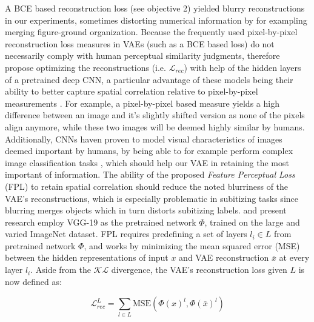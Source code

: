 \documentclass[twocolumn]{article}
\begin{document}
A BCE based reconstruction loss (see objective 2) yielded blurry reconstructions in our experiments, sometimes distorting numerical information by for exampling merging figure-ground organization.
Because the frequently used pixel-by-pixel reconstruction loss measures
in VAEs (such as a BCE based loss) do not necessarily comply with human perceptual similarity
judgments, \citet{hou2017deep} therefore propose optimizing the reconstructions (i.e. \(\mathcal{L}_{rec}\)) with help of the hidden layers of a pretrained deep CNN, a particular advantage of these models being their ability to better capture spatial correlation relative to pixel-by-pixel measurements \citep{hou2017deep}. For example, a pixel-by-pixel based measure yields a high difference between an image and it's slightly shifted version as none of the pixels align anymore, while these two images will be deemed highly similar by humans.
Additionally, CNNs haven proven to model visual characteristics of
images deemed important by humans, by being able to for example perform
complex image classification tasks \citep{krizhevsky2012imagenet}, which should help our VAE in retaining the most important of information.  The ability
of the proposed \emph{Feature Perceptual Loss} (FPL) to retain spatial
correlation should reduce the noted blurriness
\citep[see for example]{larsen2015autoencoding} of the VAE's reconstructions, which is
especially problematic in subitizing tasks since blurring merges objects
which in turn distorts subitizing labels. \citet{hou2017deep} and
present research employ VGG-19 \citep{simonyan2014very} as the
pretrained network \(\Phi\), trained on the large and varied ImageNet
\citep{russakovsky2015imagenet} dataset. FPL requires predefining a set
of layers \(l_i \in L\) from pretrained network \(\Phi\), and works by
minimizing the mean squared error (MSE) between the hidden
representations of input \(x\) and VAE reconstruction \(\bar{x}\) at
every layer \(l_i\). Aside from the \(\mathcal{KL}\) divergence, the
VAE's reconstruction loss given $L$ is now defined as:

\[ \mathcal{L}^{L}_{rec} = \sum_{l \in L}^{} \textrm{MSE}(\Phi(x)^{l}, \Phi(\bar{x})^{l})\]
\end{document}
